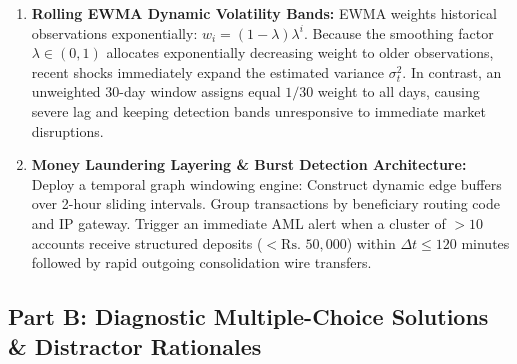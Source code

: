 \begin{enumerate}[label=\textbf{P10.\arabic*}]
    \item \textbf{Rolling EWMA Dynamic Volatility Bands:}
    EWMA weights historical observations exponentially: $w_i = (1 - \lambda) \lambda^i$. Because the smoothing factor $\lambda \in (0, 1)$ allocates exponentially decreasing weight to older observations, recent shocks immediately expand the estimated variance $\sigma_t^2$. In contrast, an unweighted 30-day window assigns equal $1/30$ weight to all days, causing severe lag and keeping detection bands unresponsive to immediate market disruptions.

    \item \textbf{Money Laundering Layering \& Burst Detection Architecture:}
    Deploy a temporal graph windowing engine: Construct dynamic edge buffers over 2-hour sliding intervals. Group transactions by beneficiary routing code and IP gateway. Trigger an immediate AML alert when a cluster of $>10$ accounts receive structured deposits ($<\text{Rs.~} 50{,}000$) within $\Delta t \le 120$ minutes followed by rapid outgoing consolidation wire transfers.
\end{enumerate}

\subsection*{Part B: Diagnostic Multiple-Choice Solutions \& Distractor Rationales}

